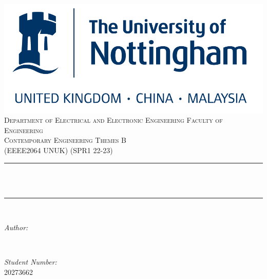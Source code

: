\begin{titlepage}
    \centering
    \includegraphics[scale = 0.4]{Config/uon.png}\\[1.0 cm]	%

    
    \textsc{\Large Department of Electrical and Electronic Engineering
    Faculty of Engineering}\\[1.5 cm]	%
    \textsc{\large Contemporary Engineering Themes B }\\[0.5 cm]				%
    \textsc{\large (EEEE2064 UNUK) (SPR1 22-23)}\\[0.5 cm]				%

    \rule{\linewidth}{0.2 mm} \\[0.4 cm]
    { \huge \bfseries \thetitle}\\
    \rule{\linewidth}{0.2 mm} \\[1.5 cm]

    \begin{minipage}{0.4\textwidth}
        \begin{flushleft} \large
            \emph{Author:}\\
            \theauthor
        \end{flushleft}
    \end{minipage}~
    \begin{minipage}{0.4\textwidth}
        \begin{flushright} \large
            \emph{Student Number:} \\
            20273662									%
        \end{flushright}
    \end{minipage}\\[1.5 cm]

    {\large \thedate}\\[0 cm]

    \vfill

\end{titlepage}
